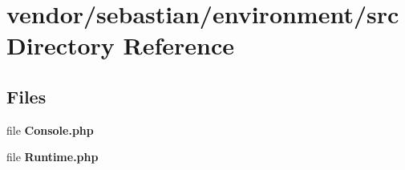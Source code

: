 \section{vendor/sebastian/environment/src Directory Reference}
\label{dir_427b487d49f130d084f45acc42d3a40b}
\subsection*{Files}
\begin{DoxyCompactItemize}
\item 
file {\bf Console.\+php}
\item 
file {\bf Runtime.\+php}
\end{DoxyCompactItemize}
